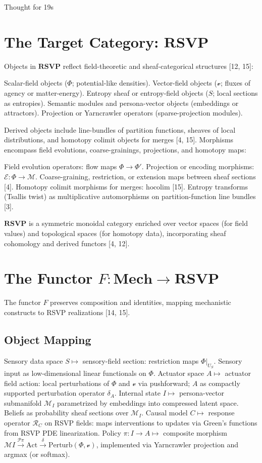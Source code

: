 Thought for 19s\documentclass{article}
\begin{document}
\section{The Target Category: $\mathbf{RSVP}$}
Objects in $\mathbf{RSVP}$ reflect field-theoretic and sheaf-categorical structures [12, 15]:

Scalar-field objects ($\Phi$; potential-like densities).
Vector-field objects ($\mathcal{v}$; fluxes of agency or matter-energy).
Entropy sheaf or entropy-field objects ($S$; local sections as entropies).
Semantic modules and persona-vector objects (embeddings or attractors).
Projection or Yarncrawler operators (sparse-projection modules).

Derived objects include line-bundles of partition functions, sheaves of local distributions, and homotopy colimit objects for merges [4, 15].
Morphisms encompass field evolutions, coarse-grainings, projections, and homotopy maps:

Field evolution operators: flow maps $\Phi \to \Phi'$.
Projection or encoding morphisms: $\mathcal{E}: \Phi \to \mathcal{M}$.
Coarse-graining, restriction, or extension maps between sheaf sections [4].
Homotopy colimit morphisms for merges: $\text{hocolim}$ [15].
Entropy transforms (Tsallis twist) as multiplicative automorphisms on partition-function line bundles [3].

$\mathbf{RSVP}$ is a symmetric monoidal category enriched over vector spaces (for field values) and topological spaces (for homotopy data), incorporating sheaf cohomology and derived functors [4, 12].
\section{The Functor $F: \mathbf{Mech} \to \mathbf{RSVP}$}
The functor $F$ preserves composition and identities, mapping mechanistic constructs to RSVP realizations [14, 15].
\subsection{Object Mapping}

Sensory data space $S \mapsto$ sensory-field section: restriction maps $\Phi|_{U_S}$. Sensory input as low-dimensional linear functionals on $\Phi$.
Actuator space $A \mapsto$ actuator field action: local perturbations of $\Phi$ and $\mathcal{v}$ via pushforward; $A$ as compactly supported perturbation operator $\delta_A$.
Internal state $I \mapsto$ persona-vector submanifold $\mathcal{M}_I$ parametrized by embeddings into compressed latent space. Beliefs as probability sheaf sections over $\mathcal{M}_I$.
Causal model $C \mapsto$ response operator $\mathcal{R}_C$ on RSVP fields: maps interventions to updates via Green's functions from RSVP PDE linearization.
Policy $\pi: I \to A \mapsto$ composite morphism $\mathcal{M}I \xrightarrow{\mathcal{P}\pi} \text{Act} \xrightarrow{\delta} \text{Perturb}(\Phi, \mathcal{v})$, implemented via Yarncrawler projection and argmax (or softmax).
\end{document}
